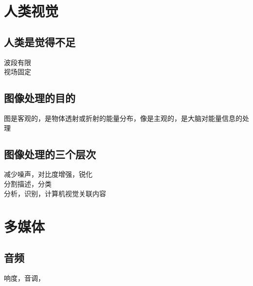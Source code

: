 \documentclass{article}
\begin{document}
\begin{CJK}{UTF8}{gbsn}
	\section{人类视觉}
	\subsection{人类是觉得不足}
	波段有限\\
	视场固定\\
	\subsection{图像处理的目的}
	图是客观的，是物体透射或折射的能量分布，像是主观的，是大脑对能量信息的处理\\
\subsection{图像处理的三个层次}
减少噪声，对比度增强，锐化\\
分割描述，分类\\
分析，识别，计算机视觉关联内容\\


\section{多媒体}
\subsection{音频}


响度，音调，

\end{CJK}
\end{document}
